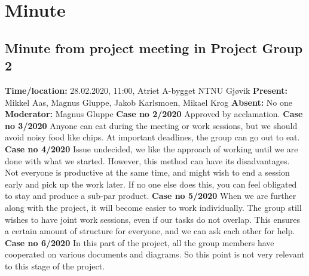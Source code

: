 \documentclass{article}
\begin{document}


\newpage
\section{Minute}
\subsection{Minute from project meeting in Project Group 2}
\newline
\textbf{Time/location:} 28.02.2020, 11:00, Atriet A-bygget NTNU Gjøvik
\newline
\textbf{Present: }Mikkel Aas, Magnus Gluppe, Jakob Karlsmoen, Mikael Krog
\newline
\textbf{Absent:} No one
\newline
\textbf{Moderator:} Magnus Gluppe
 \newline \newline
\textbf{Case no 2/2020} \newline
Approved by acclamation.  \newline  \newline
\textbf{Case no 3/2020}  \newline
Anyone can eat during the meeting or work sessions, but we should avoid noisy food like chips. At important deadlines, the group can go out to eat. \newline  \newline
\textbf{Case no 4/2020}  \newline
Issue undecided, we like the approach of working until we are done with what we started. However, this method can have its disadvantages. Not everyone is productive at the same time, and might wish to end a session early and pick up the work later. If no one else does this, you can feel obligated to stay and produce a sub-par product.  \newline  \newline
\textbf{Case no 5/2020}  \newline
When we are further along with the project, it will become easier to work individually. The group still wishes to have joint work sessions, even if our tasks do not overlap. This ensures a certain amount of structure for everyone, and we can ask each other for help.  \newline  \newline
\textbf{Case no 6/2020}  \newline
In this part of the project, all the group members have cooperated on various documents and diagrams. So this point is not very relevant to this stage of the project.
\end{document}
